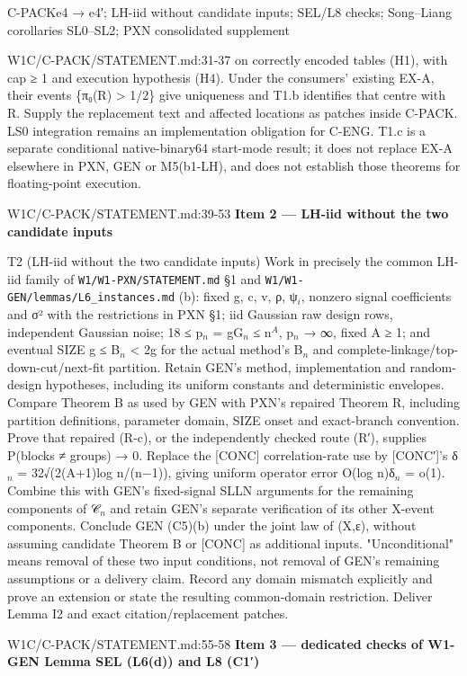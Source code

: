 \begin{card}{C-PACK}{e4 → e4′; LH-iid without candidate inputs; SEL/L8 checks; Song–Liang corollaries SL0–SL2; PXN consolidated supplement}
\begin{stmt}{W1C/C-PACK/STATEMENT.md:31-37}
on correctly encoded tables (H1), with cap ≥ 1 and execution hypothesis (H4). Under the consumers' existing EX-A, their
events \{π₀(R) > 1/2\} give uniqueness and T1.b identifies that centre with R. Supply the replacement text and affected
locations as patches inside C-PACK. LS0 integration remains an implementation obligation for C-ENG. T1.c is a separate
conditional native-binary64 start-mode result; it does not replace EX-A elsewhere in PXN, GEN or M5(b1-LH), and does not
establish those theorems for floating-point execution.
\end{stmt}
\begin{stmt}{W1C/C-PACK/STATEMENT.md:39-53}
\textbf{Item 2 — LH-iid without the two candidate inputs}

T2 (LH-iid without the two candidate inputs) Work in precisely the common LH-iid family of \texttt{W1/W1-PXN/STATEMENT.md} §1 and
\texttt{W1/W1-GEN/lemmas/L6\_instances.md} (b): fixed g, c, v, ρ, ψ$_{i}$, nonzero signal coefficients and σ² with the restrictions in
PXN §1; iid Gaussian raw design rows, independent Gaussian noise; 18 ≤ p$_{n}$ = gG$_{n}$ ≤ n$^{A}$, p$_{n}$ → ∞, fixed A ≥ 1; and
eventual SIZE g ≤ B$_{n}$ < 2g for the actual method's B$_{n}$ and complete-linkage/top-down-cut/next-fit partition. Retain GEN's
method, implementation and random-design hypotheses, including its uniform constants and deterministic envelopes.
Compare Theorem B as used by GEN with PXN's repaired Theorem R, including partition definitions, parameter domain, SIZE
onset and exact-branch convention. Prove that repaired (R-c), or the independently checked route (R′), supplies
P(blocks ≠ groups) → 0. Replace the [CONC] correlation-rate use by [CONC′]'s δ$_{n}$ = 32√(2(A+1)log n/(n−1)), giving uniform
operator error O(log n)δ$_{n}$ = o(1). Combine this with GEN's fixed-signal SLLN arguments for the remaining components of 𝒞$_{n}$
and retain GEN's separate verification of its other X-event components. Conclude GEN (C5)(b) under the joint law of
(X,ε), without assuming candidate Theorem B or [CONC] as additional inputs. "Unconditional" means removal of these two
input conditions, not removal of GEN's remaining assumptions or a delivery claim. Record any domain mismatch explicitly
and prove an extension or state the resulting common-domain restriction. Deliver Lemma I2 and exact citation/replacement
patches.
\end{stmt}
\begin{stmt}{W1C/C-PACK/STATEMENT.md:55-58}
\textbf{Item 3 — dedicated checks of W1-GEN Lemma SEL (L6(d)) and L8 (C1′)}


\end{stmt}
\end{card}
